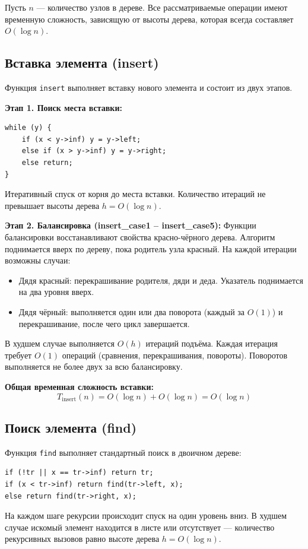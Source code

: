 \documentclass[otchet]{SCWorks}
\begin{document}
Пусть \(n\) — количество узлов в дереве. Все рассматриваемые операции имеют временную сложность, зависящую от высоты дерева, которая всегда составляет \(O(\log n)\).

\subsection*{Вставка элемента (insert)}

Функция \texttt{insert} выполняет вставку нового элемента и состоит из двух этапов.

\textbf{Этап 1. Поиск места вставки:}
\begin{verbatim}
while (y) {
    if (x < y->inf) y = y->left;
    else if (x > y->inf) y = y->right;
    else return;
}
\end{verbatim}
Итеративный спуск от корня до места вставки. Количество итераций не превышает высоты дерева \(h = O(\log n)\).

\textbf{Этап 2. Балансировка (insert\_case1 – insert\_case5):}
Функции балансировки восстанавливают свойства красно-чёрного дерева. Алгоритм поднимается вверх по дереву, пока родитель узла красный. На каждой итерации возможны случаи:
\begin{itemize}
    \item Дядя красный: перекрашивание родителя, дяди и деда. Указатель поднимается на два уровня вверх.
    \item Дядя чёрный: выполняется один или два поворота (каждый за \(O(1)\)) и перекрашивание, после чего цикл завершается.
\end{itemize}
В худшем случае выполняется \(O(h)\) итераций подъёма. Каждая итерация требует \(O(1)\) операций (сравнения, перекрашивания, повороты). Поворотов выполняется не более двух за всю балансировку.

\textbf{Общая временная сложность вставки:}
\[
T_{\text{insert}}(n) = O(\log n) + O(\log n) = O(\log n)
\]

\subsection*{Поиск элемента (find)}

Функция \texttt{find} выполняет стандартный поиск в двоичном дереве:
\begin{verbatim}
if (!tr || x == tr->inf) return tr;
if (x < tr->inf) return find(tr->left, x);
else return find(tr->right, x);
\end{verbatim}
На каждом шаге рекурсии происходит спуск на один уровень вниз. В худшем случае искомый элемент находится в листе или отсутствует — количество рекурсивных вызовов равно высоте дерева \(h = O(\log n)\).
\end{document}
